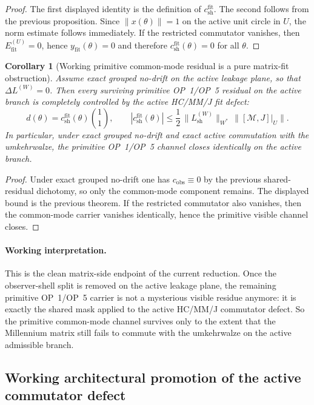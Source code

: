 \documentclass[12pt,a4paper]{article}
\newtheorem{corollary}[theorem]{Corollary}
\begin{document}
\begin{proof}
The first displayed identity is the definition of $c_{\mathrm{sh}}^{\mathrm{fit}}$. The second follows from the previous proposition. Since $\|x(\theta)\|=1$ on the active unit circle in $U$, the norm estimate follows immediately. If the restricted commutator vanishes, then $E_{\mathrm{fit}}^{(U)}=0$, hence $y_{\mathrm{fit}}(\theta)=0$ and therefore $c_{\mathrm{sh}}^{\mathrm{fit}}(\theta)=0$ for all $\theta$.
\end{proof}

\begin{corollary}[Working primitive common-mode residual is a pure matrix-fit obstruction]
Assume exact grouped no-drift on the active leakage plane, so that $\Delta L^{(W)}=0$. Then every surviving primitive OP~1/OP~5 residual on the active branch is completely controlled by the active HC/MM/J fit defect:
\[
 d(\theta)=c_{\mathrm{sh}}^{\mathrm{fit}}(\theta)\binom{1}{1},
 \qquad
 |c_{\mathrm{sh}}^{\mathrm{fit}}(\theta)|
 \le
 \frac12\,\|L_{\mathrm{sh}}^{(W)}\|_{W^*}\,\|[\mathcal M,J]\big|_{U}\|.
\]
In particular, under exact grouped no-drift and exact active commutation with the umkehrwalze, the primitive OP~1/OP~5 channel closes identically on the active branch.
\end{corollary}

\begin{proof}
Under exact grouped no-drift one has $c_{\mathrm{obs}}\equiv 0$ by the previous shared-residual dichotomy, so only the common-mode component remains. The displayed bound is the previous theorem. If the restricted commutator also vanishes, then the common-mode carrier vanishes identically, hence the primitive visible channel closes.
\end{proof}

\paragraph{Working interpretation.}
This is the clean matrix-side endpoint of the current reduction. Once the observer-shell split is removed on the active leakage plane, the remaining primitive OP~1/OP~5 carrier is not a mysterious visible residue anymore: it is exactly the shared mask applied to the active HC/MM/J commutator defect. So the primitive common-mode channel survives only to the extent that the Millennium matrix still fails to commute with the umkehrwalze on the active admissible branch.



\subsection*{Working architectural promotion of the active commutator defect}
\end{document}
